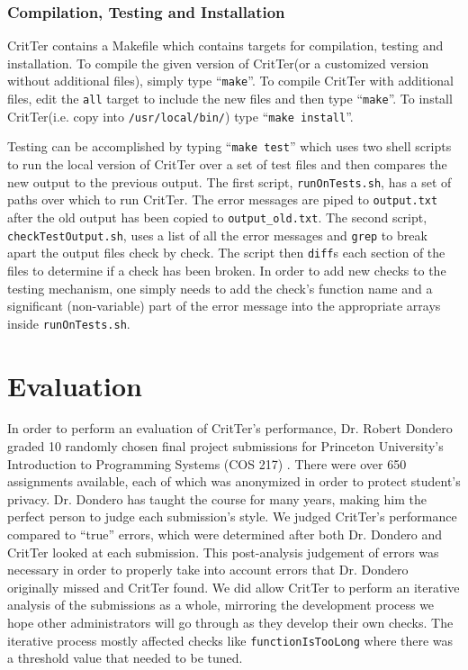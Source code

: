 \documentclass[12pt]{report}
\newcommand{\programName}{CritTer\xspace}
\begin{document}
\subsection{Compilation, Testing and Installation}

\programName contains a Makefile which contains targets for compilation, testing and installation. To 
compile the given version of \programName (or a customized version without additional files), simply 
type ``\lstinline{make}''. To compile \programName with additional files, edit the \lstinline{all} target to 
include the new files and then type ``\lstinline{make}''. To install \programName (i.e. copy into 
\lstinline{/usr/local/bin/}) type ``\lstinline{make install}''.

Testing can be accomplished by typing ``\lstinline{make test}'' which uses two shell scripts to run the 
local version of \programName over a set of test files and then compares the new output to the previous 
output. The first script, \lstinline{runOnTests.sh}, has a set of paths over which to run \programName. The 
error messages are piped to \lstinline{output.txt} after the old output has been copied to 
\lstinline{output_old.txt}. The second script, \lstinline{checkTestOutput.sh}, uses a list of all the error 
messages and \lstinline{grep} to break apart the output files check by check. The script then 
\lstinline{diff}s each section of the files to determine if a check has been broken. In order to add new 
checks to the testing mechanism, one simply needs to add the check's function name and a significant 
(non-variable) part of the error message into the appropriate arrays inside \lstinline{runOnTests.sh}.

\chapter{Evaluation}

\newcommand{\human}{Dr.\ Dondero\xspace}

In order to perform an evaluation of \programName's performance, Dr. Robert Dondero graded 
10 randomly chosen final project submissions for Princeton University's Introduction to Programming 
Systems (COS 217) \cite{cos217}. There were over 650 assignments available, each of which was 
anonymized in order to protect student's privacy. Dr. Dondero has taught the course for many years, 
making him the perfect person to judge each submission's style. We judged \programName's 
performance compared to ``true'' errors, which were determined after both Dr. Dondero and 
\programName looked at each submission. This post-analysis judgement of errors was necessary in 
order to properly take into account errors that Dr. Dondero originally missed and  \programName found. 
We did allow \programName to perform an iterative analysis of the submissions as a whole, mirroring 
the development process we hope other administrators will go through as they develop their own 
checks. The iterative process mostly affected checks like \lstinline{functionIsTooLong} where there was a 
threshold value that needed to be tuned. 
\end{document}
